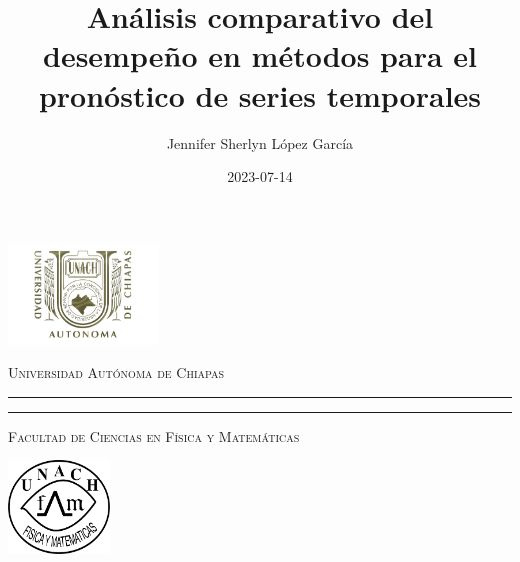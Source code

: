 \documentclass[
  us-letterpaper,
]{scrreprt}
\title{Análisis comparativo del desempeño en métodos para el pronóstico
de series temporales}
\author{Jennifer Sherlyn López García}
\date{2023-07-14}
\theoremstyle{plain}
\theoremstyle{definition}
\theoremstyle{plain}
\theoremstyle{definition}
\theoremstyle{remark}
\begin{document}
\begin{titlepage}
\hspace{-1.7cm} %
\begin{minipage}[t][0.03\textheight][c]{0.22\textwidth}
        \includegraphics[width=4.0cm]{logounach.png}
\end{minipage}\hspace{0.4cm}
\begin{minipage}[t][0.03\textheight][c]{0.69\textwidth}
\begin{center}
                \textsc{\huge Universidad Autónoma de Chiapas}\\[0.3cm]
                \hrule height 2.5pt
                \vspace{0.2cm}
                \hrule height1pt
                \vspace{0.3cm}
                \textsc{\Large Facultad de Ciencias en Física y Matemáticas}
\end{center}
\end{minipage}\hspace{0.2cm}
\begin{minipage}[t][0.03\textheight][c]{0.2\textwidth}
		\includegraphics[width=2.7cm]{logofcfm.png}
\end{minipage}\\
\begin{minipage}[t][0.93\textheight][c]{0.06\textwidth}
\vspace{60pt}
    \begin{center}
        \vrule width1pt height18cm
        \vspace{5mm}
        \vrule width2.5pt height18cm
        \vspace{5mm}
        \vrule width1pt height18cm
   \end{center}
\end{minipage}\hspace{1.3cm} %
\begin{minipage}[t][0.95\textheight][c]{0.7\textwidth}


\end{minipage}
\end{titlepage}
\end{document}
